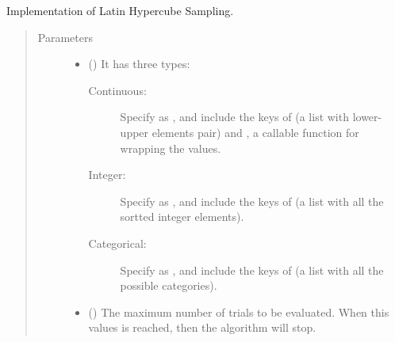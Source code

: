 \documentclass[letterpaper,10pt,english]{sphinxmanual}
\begin{document}
\begin{fulllineitems}
\label{\detokenize{apidoc:pybatdoe.batch_lhs.LHSSearch}}
Implementation of Latin Hypercube Sampling.
\begin{quote}\begin{description}
\item[{Parameters}] \leavevmode\begin{itemize}
\item {} 
 () \textendash{} 
It has three types:
\begin{description}
\item[{Continuous: }] \leavevmode
Specify  as , and include the keys of  (a list with lower-upper elements pair) and
, a callable function for wrapping the values.

\item[{Integer:}] \leavevmode
Specify  as , and include the keys of  (a list with all the sortted integer elements).

\item[{Categorical:}] \leavevmode
Specify  as , and include the keys of  (a list with all the possible categories).

\end{description}


\item {} 
 (\sphinxstyleliteralemphasis{\sphinxupquote{, }}\sphinxstyleliteralemphasis{\sphinxupquote{, }}) \textendash{} The maximum number of trials to be evaluated. When this values is reached, 
then the algorithm will stop.


\end{itemize}
\end{description}
\end{quote}
\end{fulllineitems}
\end{document}
